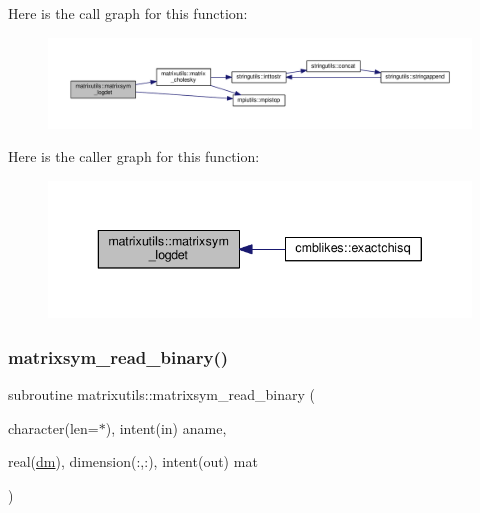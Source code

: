 Here is the call graph for this function\+:
\nopagebreak
\begin{figure}[H]
\begin{center}
\leavevmode
\includegraphics[width=350pt]{namespacematrixutils_a4117e3e0068005bf79a0db9745a8dde6_cgraph}
\end{center}
\end{figure}
Here is the caller graph for this function\+:
\nopagebreak
\begin{figure}[H]
\begin{center}
\leavevmode
\includegraphics[width=340pt]{namespacematrixutils_a4117e3e0068005bf79a0db9745a8dde6_icgraph}
\end{center}
\end{figure}
\mbox{\label{namespacematrixutils_a7572f4e0a0c8b958126d5d3c8b46f16a}} 
\subsubsection{\texorpdfstring{matrixsym\+\_\+read\+\_\+binary()}{matrixsym\_read\_binary()}}
{\footnotesize\ttfamily subroutine matrixutils\+::matrixsym\+\_\+read\+\_\+binary (\begin{DoxyParamCaption}\item[{character(len=$\ast$), intent(in)}]{aname,  }\item[{real(\mbox{\hyperlink{namespacematrixutils_a7bdc564986ea4d90f51201c75606ef3d}{dm}}), dimension(\+:,\+:), intent(out)}]{mat }\end{DoxyParamCaption})}



